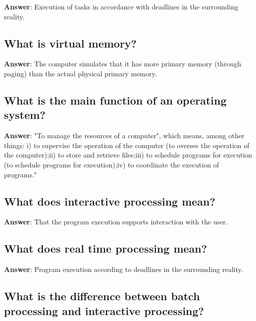 \documentclass[a4paper,11pt,oneside]{article}
\begin{document}
\begin{sloppypar}
\label{q:106:sa:en:True}

\textbf{Answer}: Execution of tasks in accordance with deadlines in the surrounding reality.



\subsection{What is virtual memory?}

\label{q:108:sa:en:True}

\textbf{Answer}: The computer simulates that it has more primary memory (through paging) than the actual physical primary memory.



\subsection{What is the main function of an operating system?}

\label{q:109:sa:en:True}

\textbf{Answer}: "To manage the resources of a computer", which means, among other things: i) to supervise the operation of the computer (to oversee the operation of the computer);ii) to store and retrieve files;iii) to schedule programs for execution (to schedule programs for execution);iv) to coordinate the execution of programs."



\subsection{What does interactive processing mean?}

\label{q:110:sa:en:True}

\textbf{Answer}: That the program execution supports interaction with the user.



\subsection{What does real time processing mean?}

\label{q:111:sa:en:True}

\textbf{Answer}: Program execution according to deadlines in the surrounding reality.



\subsection{What is the difference between batch processing and interactive processing?}


\end{sloppypar}
\end{document}
